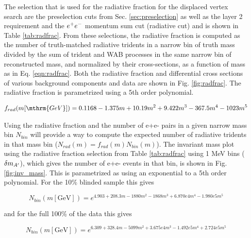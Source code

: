 The selection that is used for the radiative fraction for the displaced vertex search are the preselection cuts from Sec. \ref{sec:preselection} as well as the layer 2 requirement and the $e^{+}e^{-}$ momentum sum cut (radiative cut) and is shown in Table \ref{tab:radfrac}. From these selections, the radiative fraction is computed as the number of truth-matched radiative tridents in a narrow bin of truth mass divided by the sum of trident and WAB processes in the same narrow bin of reconstructed mass, and normalized by their cross-sections, as a function of mass as in Eq. \ref{eqn:radfrac}. Both the radiative fraction and differential cross sections of various background components and data are shown in Fig. \ref{fig:radfrac}. The radiative fraction is parametrized using a 5th order polynomial.

\begin{equation}
f_{rad}(m[\mthrm{GeV}])= 0.1168-1.375m + 10.19m^2 +9.422m^3 -367.5 m^4 -1023 m^5
\label{eqn:radfrac_param}
\end{equation}


Using the radiative fraction and the number of e+e- pairs in a given narrow mass bin $N_{bin}$ will provide a way to compute the expected number of radiative tridents in that mass bin ($N_{rad}(m)=f_{rad}(m) N_{bin}(m)$). The invariant mass plot using the radiative fraction selection from Table \ref{tab:radfrac} using 1 MeV bins ($\delta m_{A^\prime}$), which gives the number of e+e- events in that bin, is shown in Fig. \ref{fig:inv_mass}. This is parametrized as using an exponential to a 5th order polynomial. For the 10\% blinded sample this gives

\begin{equation}
N_{bin}(m[\mathrm{GeV}])=e^{ 4.903+208.3m -1880m^2 -1868m^3 + 6.870e4m^4 -1.980e5 m^5}
\label{eqn:num_param}
\end{equation}

and for the full 100\% of the data this gives

\begin{equation}
N_{bin}(m[\mathrm{GeV}])=e^{ 6.309+328.4m -5099m^2 +3.675e4m^3 -1.492e5m^4 +2.724e5 m^5}
\label{eqn:num_param2}
\end{equation}

